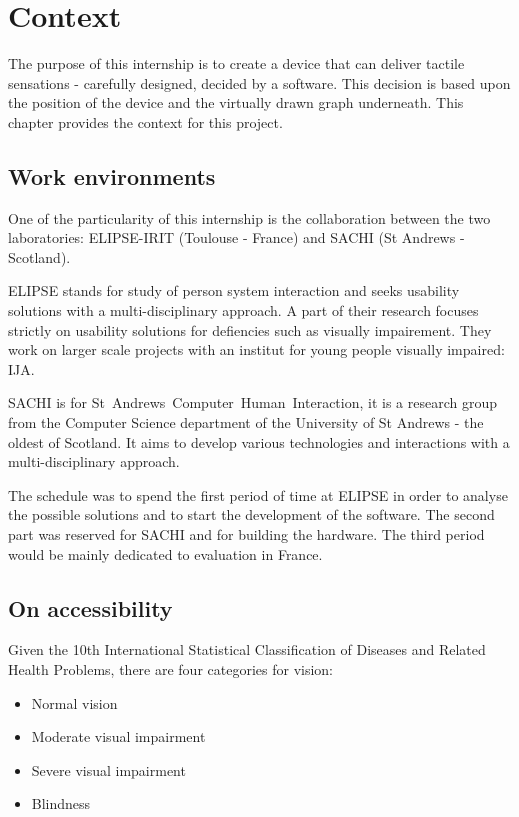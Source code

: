 \chapter{Context}

The purpose of this internship is to create a device that can deliver tactile sensations - carefully designed, decided by a software. This decision is based upon the position of the device and the virtually drawn graph underneath. This chapter provides the context for this project.

\section{Work environments}\label{work-environments}

One of the particularity of this internship is the collaboration between the two laboratories: ELIPSE-IRIT (Toulouse - France) and SACHI (St Andrews - Scotland). 

ELIPSE stands for study of person system interaction and seeks usability solutions with a multi-disciplinary approach. A part of their research focuses strictly on usability solutions for defiencies such as visually impairement. They work on larger scale projects with an institut for young people visually impaired: IJA.

SACHI is for St Andrews Computer Human Interaction, it is a research group from the Computer Science department of the University of St Andrews - the oldest of Scotland. It aims to develop various technologies and interactions with a multi-disciplinary approach.

The schedule was to spend the first period of time at ELIPSE in order to analyse the possible solutions and to start the development of the software. 
The second part was reserved for SACHI and for building the hardware. The third period would be mainly dedicated to evaluation in France.

\section{On accessibility}\label{on-accessibility}

Given the 10th International Statistical Classification of Diseases and
Related Health Problems, there are four categories for vision:

\begin{itemize}
\item
  Normal vision
\item
  Moderate visual impairment
\item
  Severe visual impairment
\item
  Blindness
\end{itemize}

